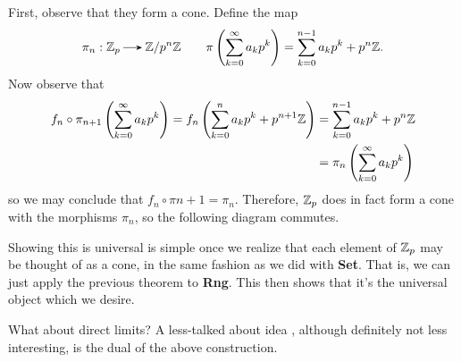 \begin{example}
        First, observe that they form a cone. Define the map 
        \[
            \pi_{n}: \zz_p \to \zz/p^{n}\zz 
            \qquad \pi\left( \sum_{k = 0}^{\infty}
            a_kp^k \right) = 
            \sum_{k =0}^{n-1}a_kp^k + p^{n}\zz.
        \]
        Now observe that 
        \begin{align*}
            f_n \circ \pi_{n+1} \left( \sum_{k = 0}^{\infty}a_kp^k \right)
            = f_n\left( \sum_{k =0}^{n}a_kp^k + p^{n+1}\mathbb{Z} \right)
            &= \sum_{k =0}^{n-1}a_kp^k + p^{n}\mathbb{Z}\\
            &= \pi_n\left(  \sum_{k = 0}^{\infty}a_kp^k \right)
        \end{align*}
        so we may conclude that $f_n \circ \pi{n+1} = \pi_n$.
        Therefore, $\mathbb{Z}_p$ does in fact form a cone with the 
        morphisms $\pi_n$, so the following diagram commutes.
        \begin{center}
        \end{center}
        Showing this is universal is simple once we realize that each
        element of $\mathbb{Z}_p$ may be thought of as a cone, in the same
        fashion as we did with \textbf{Set}. That is, we can just 
        apply the previous theorem to \textbf{Rng}. 
        This then shows that it's the universal object which we desire.
    \end{example}

    What about direct limits? A less-talked about idea
    , although definitely not less interesting, is the 
    dual of the above construction.

